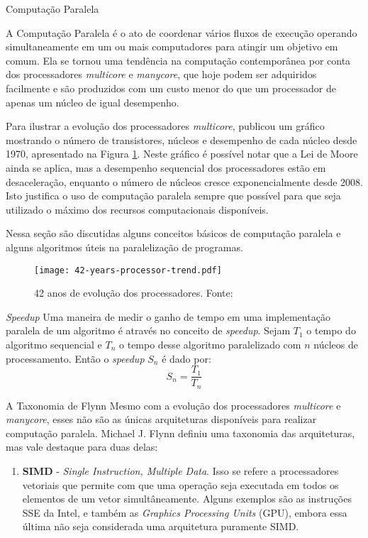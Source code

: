 \begin{section}{Computação Paralela}
\label{sec:parallel_comp}

    A Computação Paralela é o ato de coordenar vários fluxos de
execução operando simultaneamente em um ou mais computadores para
atingir um objetivo em comum. Ela se tornou uma tendência na
computação contemporânea por conta dos processadores \textit{multicore}
e \textit{manycore}, que hoje podem ser adquiridos facilmente e são
produzidos com um custo menor do que um processador de apenas um
núcleo de igual desempenho.

    Para ilustrar a evolução dos processadores \textit{multicore}, \cite{42years}
    publicou um gráfico mostrando o número
de transistores, núcleos e desempenho de cada núcleo desde 1970,
apresentado na Figura \ref{fig:42years}.
Neste gráfico é possível notar que a Lei de Moore ainda se aplica,
mas a desempenho sequencial dos processadores estão em desaceleração,
enquanto o número de núcleos cresce exponencialmente desde 2008. Isto
justifica o uso de computação paralela sempre que possível para que
seja utilizado o máximo dos recursos computacionais disponíveis.

    Nessa seção são discutidas alguns conceitos básicos de computação
paralela e alguns algoritmos úteis na paralelização de programas.

\begin{figure}[ht]
 \centering
 \texttt{[image: 42-years-processor-trend.pdf]}
 \caption{42 anos de evolução dos processadores. Fonte: \cite{42years}}
 \label{fig:42years}
\end{figure}

\begin{subsection}{\textit{Speedup}}
    Uma maneira de medir o ganho de tempo em uma implementação paralela
de um algoritmo é através no conceito de \textit{speedup}. Sejam $T_1$
o tempo do algoritmo sequencial e $T_n$ o tempo desse algoritmo paralelizado
    com $n$ núcleos de processamento. Então o \textit{speedup} $S_n$
é dado por:
    $$ S_n = \frac{T_1}{T_n} $$

\end{subsection}


\begin{subsection}{A Taxonomia de Flynn}
	Mesmo com a evolução dos processadores \textit{multicore} e
\textit{manycore}, esses não são as únicas arquiteturas disponíveis para
realizar computação paralela.  Michael J. Flynn \citep{pacheco:2011} definiu
uma taxonomia das arquiteturas, mas vale destaque para duas delas:
\begin{enumerate}
    \item \textbf{SIMD} - \textit{Single Instruction, Multiple Data}. Isso se refere
        a processadores vetoriais que permite com que uma operação seja executada em
        todos os elementos de um vetor simultâneamente. Alguns exemplos são as
        instruções SSE da Intel, e também as \textit{Graphics Processing Units} (GPU),
        embora essa última não seja considerada uma arquitetura puramente SIMD.


\end{enumerate}
\end{subsection}
\end{section}
